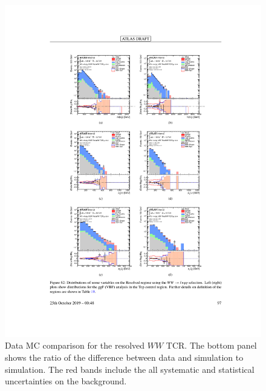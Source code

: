 \begin{figure}[h!]
  \centering
  \includegraphics[width=\hsize , height=\textheight , keepaspectratio]{figures/Analysis/datamc/resolved_ww_tcr.pdf}
      \caption{Data MC comparison for the resolved $WW$ TCR. The bottom panel shows the ratio of the difference between data and simulation to simulation. The red bands include the all systematic and statistical uncertainties on the background. } 
  \label{fig:resolved_ww_TCR_datamc}
\end{figure} 
\FloatBarrier


